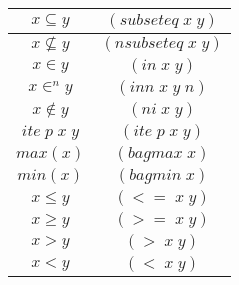 \begin{center}
\begin{tabular}{|c|c|}
  \hline
  $x \subseteq y$ & $(subseteq \;x \;y)$ \\
  \hline
  $x \nsubseteq y$ & $(nsubseteq \;x \;y)$ \\
  \hline
  $x \in y$ & $(in \;x \;y)$ \\
  \hline
  $x \in^{n} y$ & $(inn \;x \;y \;n)$ \\
  \hline
  $x \notin y$ & $(ni \;x \;y)$ \\
  \hline
  $ite \;p \;x \;y$ & $(ite\;p\;x\;y)$ \\
  \hline
  $max(x)$ & $(bagmax \;x )$ \\
  \hline
  $min(x)$ & $(bagmin \;x )$ \\
  \hline
  $x \leq y$ & $(<= \;x \;y)$ \\
  \hline
  $x \geq y$ & $(>= \;x \;y)$ \\
  \hline
  $x > y$ & $(> \;x \;y)$ \\
  \hline
  $x < y$ & $(< \;x \;y)$ \\
  \hline


\end{tabular}
\end{center}
